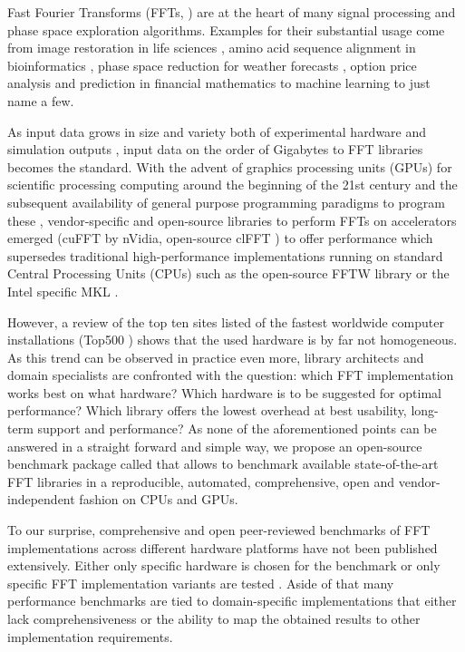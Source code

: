 Fast Fourier Transforms (FFTs, \citep{van1992computational}) are at the heart of many signal processing and phase space exploration algorithms. Examples for their substantial usage come from image restoration in life sciences \citep{preibisch2014efficient,schmid2015real}, amino acid sequence alignment in bioinformatics \citep{katoh2002mafft}, phase space reduction for weather forecasts \citep{maronga2015parallelized}, option price analysis and prediction in financial mathematics \citep{dempster2002spread,hurd2010fourier} to machine learning \citep{collobert2011torch7,jia2014caffe,abadi2016tensorflow} to just name a few.

As input data grows in size and variety both of experimental hardware \citep{huisken2004optical} and simulation outputs \citep{maronga2015parallelized}, input data on the order of Gigabytes to FFT libraries becomes the standard. With the advent of graphics processing units (GPUs) for scientific processing computing around the beginning of the 21st century and the subsequent availability of general purpose programming paradigms to program these \citep{du2012cuda}, vendor-specific and open-source libraries to perform FFTs on accelerators emerged (cuFFT \citep{nvidia2010cufft} by nVidia, open-source clFFT \citep{clfft}) to offer performance which supersedes traditional high-performance implementations running on standard Central Processing Units (CPUs) such as the open-source FFTW library \citep{FFTW97,FFTW05} or the Intel specific MKL \citep{intel2007intel}.

However, a review of the top ten sites listed of the fastest worldwide computer installations (Top500 \citep{meuer2011top500}) shows that the used hardware is by far not homogeneous. As this trend can be observed in practice even more, library architects and domain specialists are confronted with the question: which FFT implementation works best on what hardware? Which hardware is to be suggested for optimal performance? Which library offers the lowest overhead at best usability, long-term support and performance? As none of the aforementioned points can be answered in a straight forward and simple way, we propose an open-source benchmark package called \gearshifft{} \citep{gearshifft_github} that allows to benchmark available state-of-the-art FFT libraries in a reproducible, automated, comprehensive, open and vendor-independent fashion on CPUs and GPUs.

To our surprise, comprehensive and open peer-reviewed benchmarks of FFT implementations across different hardware platforms have not been published extensively. Either only specific hardware is chosen for the benchmark \citep{park2015fast,eleftheriou2005performance} or only specific FFT implementation variants are tested \citep{shoc2010,dongarra2013hpc}. Aside of that many performance benchmarks are tied to domain-specific implementations \citep{fialka2006fft} that either lack comprehensiveness or the ability to map the obtained results to other implementation requirements.

